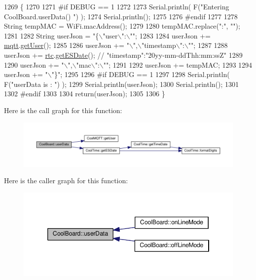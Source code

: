 \begin{DoxyCode}
1269 \{
1270 
1271 \textcolor{preprocessor}{#if DEBUG == 1}
1272 
1273     Serial.println( F(\textcolor{stringliteral}{"Entering CoolBoard.userData() "}) );
1274     Serial.println();
1275 
1276 \textcolor{preprocessor}{#endif}
1277 
1278     String tempMAC = WiFi.macAddress();
1279 
1280     tempMAC.replace(\textcolor{stringliteral}{":"}, \textcolor{stringliteral}{""});
1281 
1282     String userJson = \textcolor{stringliteral}{"\{\(\backslash\)"user\(\backslash\)":\(\backslash\)""};
1283 
1284     userJson += \hyperlink{class_cool_board_a2399f44d7c23c1149a335cb3b46d90f1}{mqtt}.\hyperlink{class_cool_m_q_t_t_a373cc92fca7760d886f02d8a6e5b3f63}{getUser}();
1285 
1286     userJson += \textcolor{stringliteral}{"\(\backslash\)",\(\backslash\)"timestamp\(\backslash\)":\(\backslash\)""};
1287 
1288     userJson += \hyperlink{class_cool_board_a50d2a6716879d64a85f3c6b44ad63275}{rtc}.\hyperlink{class_cool_time_ac4f32ee513c1328d984306645e8785a4}{getESDate}(); \textcolor{comment}{// "timestamp":"20yy-mm-ddThh:mm:ssZ"}
1289 
1290     userJson += \textcolor{stringliteral}{"\(\backslash\)",\(\backslash\)"mac\(\backslash\)":\(\backslash\)""};
1291 
1292     userJson += tempMAC;
1293 
1294     userJson += \textcolor{stringliteral}{"\(\backslash\)"\}"};
1295 
1296 \textcolor{preprocessor}{#if DEBUG == 1}
1297 
1298     Serial.println( F(\textcolor{stringliteral}{"userData is : "}) );
1299     Serial.println(userJson);
1300     Serial.println();
1301 
1302 \textcolor{preprocessor}{#endif  }
1303     
1304     \textcolor{keywordflow}{return}(userJson);
1305     
1306 \}
\end{DoxyCode}
Here is the call graph for this function\+:\nopagebreak
\begin{figure}[H]
\begin{center}
\leavevmode
\includegraphics[width=350pt]{d7/df9/class_cool_board_ae7358fb6e623cfc81b775f5f1734909b_cgraph}
\end{center}
\end{figure}
Here is the caller graph for this function\+:\nopagebreak
\begin{figure}[H]
\begin{center}
\leavevmode
\includegraphics[width=346pt]{d7/df9/class_cool_board_ae7358fb6e623cfc81b775f5f1734909b_icgraph}
\end{center}
\end{figure}


